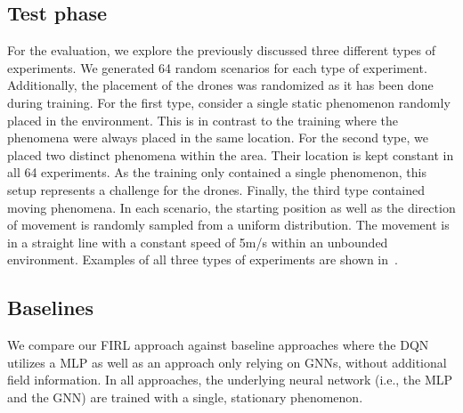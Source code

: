 \subsection{Test phase}
For the evaluation, 
 we explore the previously discussed three different types of experiments.
%
We generated 64 random scenarios for each type of experiment. 
 Additionally, the placement of the drones was randomized as it has been done during training.
For the first type, consider a single static phenomenon randomly placed in the environment. 
This is in contrast to the training where the phenomena were always placed in the same location.  
For the second type, we placed two distinct phenomena within the area. 
Their location is kept constant in all 64 experiments. 
As the training only contained a single phenomenon, 
this setup represents a challenge for the drones.
Finally, the third type contained moving phenomena. 
In each scenario, the starting position as well as the direction of movement is randomly sampled from a uniform distribution. 
The movement is in a straight line with a constant speed of 5m/s within an unbounded environment. 
%
Examples of all three types of experiments are shown in~. %


\subsection{Baselines}
We compare our \ac{FIRL} approach against baseline approaches where the \ac{DQN} utilizes a \ac{MLP} as well as an approach only relying on \acp{GNN}, without additional field information. 
%
In all approaches, the underlying neural network (i.e., the \ac{MLP} and the \ac{GNN}) are trained %
with a single, stationary phenomenon.
%

